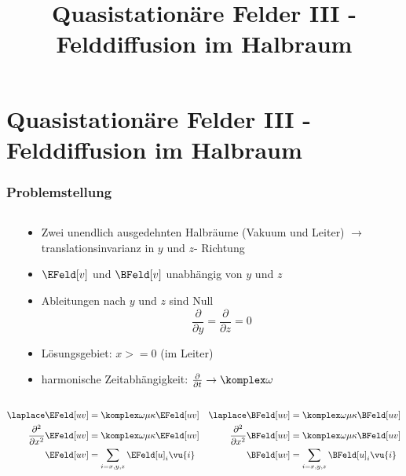 
  
\title[TET: Quasistationäre Felder III- Felddiffusion im Halbraum]{Quasistationäre Felder III - Felddiffusion im Halbraum}


% 
% 

\maketitle

% 
% 
\section{Quasistationäre Felder III - Felddiffusion im Halbraum}

\begin{frame}
  \frametitle{Problemstellung}
  \begin{columns}
    \begin{column}{.4\linewidth}
      \centerline{\resizebox{\columnwidth}{!}{}}
      \end{column}
   \begin{column}{.6\linewidth}
  \begin{itemize}[<+->]
  \item Zwei unendlich ausgedehnten Halbräume (Vakuum und Leiter) $\to$ translationsinvarianz in $y$ und $z$- Richtung
  \item \(\EFeld[v] \) und \(\BFeld[v] \) unabhängig von \(y\) und \(z\)
\item Ableitungen nach \(y\) und \(z\) sind Null
  $$
  \dfrac{\partial}{\partial y} = \dfrac{\partial}{\partial z} = 0
  $$
  \item Lösungsgebiet: $x>=0$ (im Leiter)
  \item harmonische Zeitabhängigkeit: $\frac{\partial}{\partial t} \to \komplex\omega$
  \end{itemize}
\end{column}
\end{columns}\pause

\begin{align*}
\laplace \EFeld[uv] &= \komplex\omega\mu\kappa \EFeld[uv]    & \laplace \BFeld[uv] &= \komplex \omega\mu \kappa \BFeld[uv]\\ 
\dfrac{\partial^2}{\partial x^2} \EFeld[uv] &= \komplex\omega\mu \kappa \EFeld[uv] & \dfrac{\partial^2}{\partial x^2} \BFeld[uv] &= \komplex \omega \mu \kappa \BFeld[uv]\\
\EFeld[uv] & = \sum_{i=x,y,z}\EFeld[u]_i \vu{i} & \BFeld[uv] &= \sum_{i=x,y,z}\BFeld[u]_i \vu{i}
\end{align*}
\end{frame}

